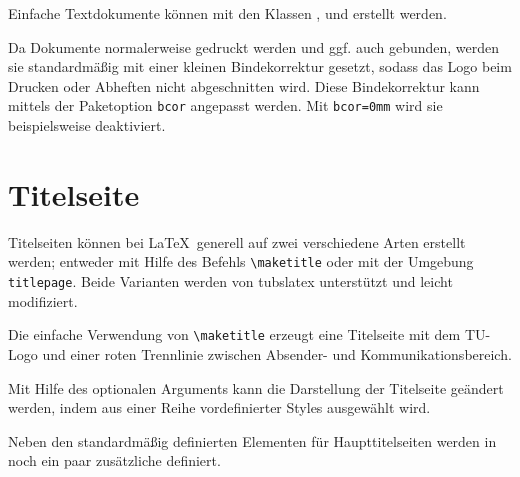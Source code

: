 \documentclass[a4paper,11pt]{tubsreprt}
\begin{document}
Einfache Textdokumente können mit den Klassen ,
 und  erstellt werden.


Da Dokumente normalerweise gedruckt werden und ggf. auch gebunden, werden
sie standardmäßig mit einer kleinen Bindekorrektur gesetzt, sodass das
Logo beim Drucken oder Abheften nicht abgeschnitten wird.
Diese Bindekorrektur kann mittels der Paketoption \texttt{bcor} angepasst werden.
Mit \texttt{bcor=0mm} wird sie beispielsweise deaktiviert.



\section{Titelseite}

Titelseiten können bei \LaTeX\ generell auf zwei verschiedene Arten erstellt
werden; entweder mit Hilfe des Befehls \lstinline{\maketitle} oder mit
der Umgebung \lstinline{titlepage}. Beide Varianten werden von tubslatex
unterstützt und leicht modifiziert.

\begin{Declaration}
\end{Declaration}

Die einfache Verwendung von \lstinline{\maketitle} erzeugt eine Titelseite
mit dem TU-Logo und einer roten Trennlinie zwischen Absender- und
Kommunikationsbereich.

Mit Hilfe des optionalen Arguments  kann die Darstellung
der Titelseite geändert werden, indem aus einer Reihe vordefinierter Styles
ausgewählt wird.\bigskip

Neben den standardmäßig definierten Elementen für Haupttitelseiten werden
in \tubslatex noch ein paar zusätzliche definiert.

\begin{Declaration}
  \\
  \\
\end{Declaration}
\end{document}

